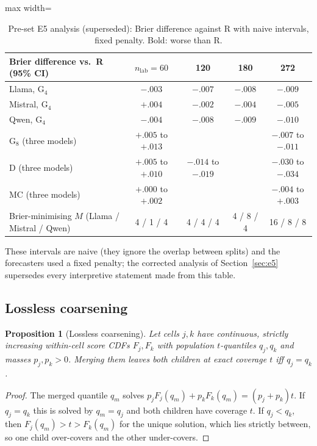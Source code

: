 \documentclass[twoside]{article}
\newtheorem{proposition}[theorem]{Proposition}
\theoremstyle{definition}
\theoremstyle{remark}
\newcommand{\1}{\mathbf{1}}
\begin{document}
\begin{table}[t]
\caption{Pre-set E5 analysis (superseded): Brier difference against R with naive intervals, fixed penalty. Bold: worse than R.}
\centering\small
\begin{adjustbox}{max width=\textwidth}
\begin{tabular}{lcccc}
\toprule
Brier difference vs.\ R (95\% CI) & $n_{\mathrm{lab}}=60$ & 120 & 180 & 272\\
\midrule
Llama, G$_4$   & $-.003$ & $-.007$ & $-.008$ & $-.009$\\
Mistral, G$_4$ & $\mathbf{+.004}$ & $-.002$ & $-.004$ & $-.005$\\
Qwen, G$_4$    & $-.004$ & $-.008$ & $-.009$ & $-.010$\\
G$_8$ (three models) & $+.005$ to $+.013$ & & & $-.007$ to $-.011$\\
D (three models) & $+.005$ to $+.010$ & $-.014$ to $-.019$ & & $-.030$ to $-.034$\\
MC (three models) & $+.000$ to $+.002$ & & & $-.004$ to $+.003$\\
\midrule
Brier-minimising $M$ (Llama / Mistral / Qwen) & 4 / 1 / 4 & 4 / 4 / 4 & 4 / 8 / 4 & 16 / 8 / 8\\
\bottomrule
\end{tabular}
\end{adjustbox}
\end{table}
These intervals are naive (they ignore the overlap between splits) and the forecasters used a fixed
penalty; the corrected analysis of Section~\ref{sec:e5} supersedes every interpretive statement made
from this table.

\subsection{Lossless coarsening}
\begin{proposition}[Lossless coarsening]
\label{prop:C}
Let cells $j,k$ have continuous, strictly increasing within-cell score CDFs $F_j,F_k$ with
population $t$-quantiles $q_j,q_k$ and masses $p_j,p_k>0$. Merging them leaves both
children at exact coverage $t$ iff $q_j=q_k$.
\end{proposition}
\begin{proof}
The merged quantile $q_m$ solves $p_jF_j(q_m)+p_kF_k(q_m)=(p_j+p_k)t$. If $q_j=q_k$ this
is solved by $q_m=q_j$ and both children have coverage $t$. If $q_j<q_k$, then
$F_j(q_m)>t>F_k(q_m)$ for the unique solution, which lies strictly between, so one child
over-covers and the other under-covers.
\end{proof}
\end{document}
